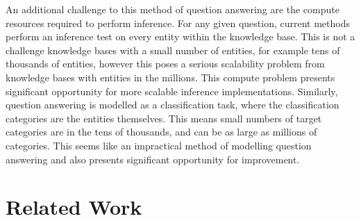 An additional challenge to this method of question answering are the compute resources required to perform inference. For any given question, current methods perform an inference test on every entity within the knowledge base. This is not a challenge knowledge bases with a small number of entities, for example tens of thousands of entities, however this poses a serious scalability problem from knowledge bases with entities in the millions. This compute problem presents significant opportunity for more scalable inference implementations. Similarly, question answering is modelled as a classification task, where the classification categories are the entities themselves. This means small numbers of target categories are in the tens of thousands, and can be as large as millions of categories. This seems like an impractical method of modelling question answering and also presents significant opportunity for improvement. 



\section{Related Work} %


